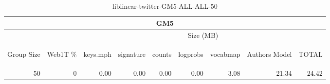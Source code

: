 \begin{center}
\begin{table}[htbp] 
 \begin{center}
\begin{tabular}{ | r | r | r | r | r | r | r | r | r |}
\hline
\multicolumn{9}{|c|}{GM5}\\
\hline
 & & \multicolumn{7}{|c|}{Size (MB)}\\ \cline{3-9}
\begin{sideways}Group Size\end{sideways} & \begin{sideways}Web1T \% \end{sideways} & \begin{sideways}keys.mph\end{sideways} & \begin{sideways}signature\end{sideways} & \begin{sideways}counts\end{sideways} & \begin{sideways}logprobs\end{sideways} & \begin{sideways}vocabmap\end{sideways} & \begin{sideways}Authors Model \end{sideways} & \begin{sideways}TOTAL\end{sideways}\\
\hline
\multirow{0}{*}{50}
 & 0 & 0.00 & 0.00 & 0.00 & 0.00 & 3.08 & 21.34 & 24.42\\ \cline{2-9}
\hline
\end{tabular}
\caption{liblinear-twitter-GM5-ALL-ALL-50}
\label{table:liblinear-twitter-GM5-ALL-ALL-50}
\end{center}
 \end{table}
\end{center}

